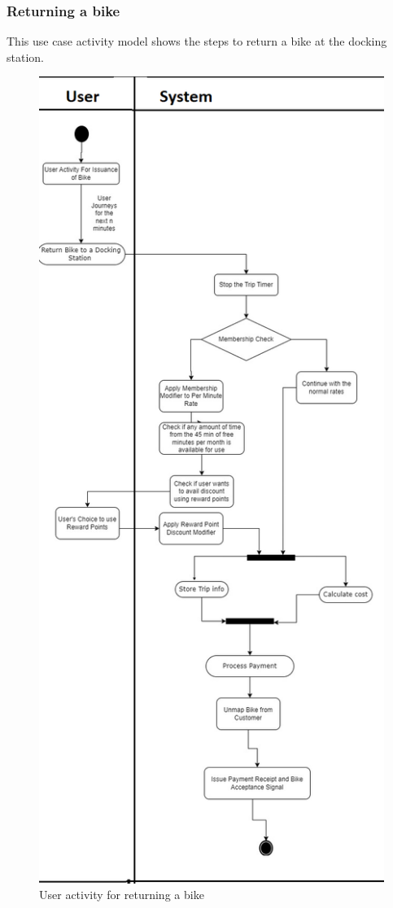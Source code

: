 \subsubsection{Returning a bike}
This use case activity model shows the steps to return a bike at the docking station.
\begin{figure}[H]
  \centering
  \includegraphics[scale = 0.60]{images/UserActivityDiagramReturnBike.png}
  \caption{User activity for returning a bike}
  \label{fig:return_bike}
\end{figure}


